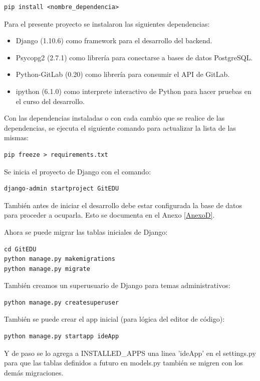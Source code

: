 \begin{lstlisting}
pip install <nombre_dependencia>
\end{lstlisting}

Para el presente proyecto se instalaron las siguientes dependencias:
\begin{itemize}
	\item Django (1.10.6) como framework para el desarrollo del backend.
    \item Psycopg2 (2.7.1) como librería para conectarse a bases de datos PostgreSQL.
    \item Python-GitLab (0.20) como librería para consumir el API de GitLab.
    \item ipython (6.1.0) como interprete interactivo de Python para hacer pruebas en el curso del desarrollo.
\end{itemize}

Con las dependencias instaladas o con cada cambio que se realice de las dependencias, se ejecuta el siguiente comando para actualizar la lista de las mismas:

\begin{lstlisting}
pip freeze > requirements.txt
\end{lstlisting}

Se inicia el proyecto de Django con el comando:

\begin{lstlisting}
django-admin startproject GitEDU
\end{lstlisting}

También antes de iniciar el desarrollo debe estar configurada la base de datos para proceder a ocuparla.  Esto se documenta en el Anexo \ref{AnexoD}.

Ahora se puede migrar las tablas iniciales de Django:
\begin{lstlisting}
cd GitEDU
python manage.py makemigrations
python manage.py migrate
\end{lstlisting}

También creamos un superusuario de Django para temas administrativos:
\begin{lstlisting}
python manage.py createsuperuser
\end{lstlisting}

También se puede crear el app inicial (para lógica del editor de código):
\begin{lstlisting}
python manage.py startapp ideApp
\end{lstlisting}

Y de paso se lo agrega a INSTALLED\_APPS una linea 'ideApp' en el settings.py para que las tablas definidos a futuro en models.py también se migren con los demás migraciones.

